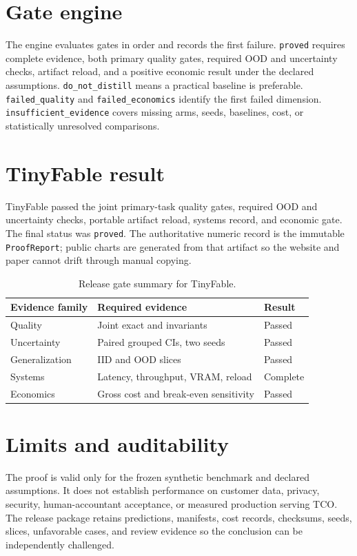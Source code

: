 \documentclass[11pt]{article}
\begin{document}
\section{Gate engine}
The engine evaluates gates in order and records the first failure. \texttt{proved} requires complete evidence, both primary quality gates, required OOD and uncertainty checks, artifact reload, and a positive economic result under the declared assumptions. \texttt{do\_not\_distill} means a practical baseline is preferable. \texttt{failed\_quality} and \texttt{failed\_economics} identify the first failed dimension. \texttt{insufficient\_evidence} covers missing arms, seeds, baselines, cost, or statistically unresolved comparisons.

\section{TinyFable result}
TinyFable passed the joint primary-task quality gates, required OOD and uncertainty checks, portable artifact reload, systems record, and economic gate. The final status was \texttt{proved}. The authoritative numeric record is the immutable \texttt{ProofReport}; public charts are generated from that artifact so the website and paper cannot drift through manual copying.

\begin{table}[h]
\centering
\begin{tabular}{lll}
\toprule
Evidence family & Required evidence & Result \\
\midrule
Quality & Joint exact and invariants & Passed \\
Uncertainty & Paired grouped CIs, two seeds & Passed \\
Generalization & IID and OOD slices & Passed \\
Systems & Latency, throughput, VRAM, reload & Complete \\
Economics & Gross cost and break-even sensitivity & Passed \\
\bottomrule
\end{tabular}
\caption{Release gate summary for TinyFable.}
\end{table}

\section{Limits and auditability}
The proof is valid only for the frozen synthetic benchmark and declared assumptions. It does not establish performance on customer data, privacy, security, human-accountant acceptance, or measured production serving TCO. The release package retains predictions, manifests, cost records, checksums, seeds, slices, unfavorable cases, and review evidence so the conclusion can be independently challenged.
\end{document}
